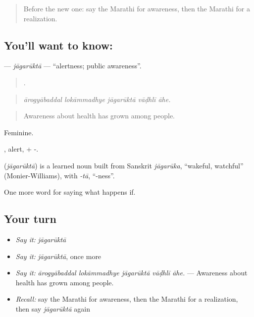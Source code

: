 \label{lesson:MR-C394-jagarukta}



\begin{quote}
Before the new one: say the Marathi for awareness, then the Marathi for a realization.
\end{quote}

\subsection*{You'll want to know: }
\textbf{} — \emph{jāgarūktā} — \textquotedblleft{}alertness; public awareness\textquotedblright{}.

\begin{quote}
    .
\end{quote}

\begin{quote}
\emph{ārogyābaddal lokāmmadhye jāgarūktā vāḍhlī āhe.}
\end{quote}

\begin{quote}
Awareness about health has grown among people.
\end{quote}

Feminine.

, alert, + -.

\begin{cousinweb}
\textbf{} (\emph{jāgarūktā}) is a learned noun built from Sanskrit \emph{jāgarūka}, \textquotedblleft{}wakeful, watchful\textquotedblright{} (Monier-Williams), with \emph{-tā}, \textquotedblleft{}-ness\textquotedblright{}.
\end{cousinweb}

\begin{grammarlens}[title={What you've built}]
One more word for saying what happens if.
\end{grammarlens}

\subsection*{Your turn}
\begin{itemize}
\raggedright
  \item \emph{Say it:} \emph{jāgarūktā}
  \item \emph{Say it:} \emph{jāgarūktā}, once more
  \item \emph{Say it:} \emph{ārogyābaddal lokāmmadhye jāgarūktā vāḍhlī āhe.} — Awareness about health has grown among people.
  \item \emph{Recall:} say the Marathi for awareness, then the Marathi for a realization, then say \emph{jāgarūktā} again
\end{itemize}

